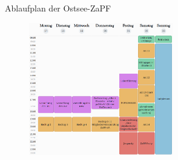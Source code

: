\documentclass[compress, aspectratio=169]{beamer}
\begin{document}
	\begin{frame}{Ablaufplan der Ostsee-ZaPF}
		\begin{figure}
			\centering
			\includegraphics[height=5.8cm]{Woche2.png}
		\end{figure}
	\end{frame}
\end{document}
